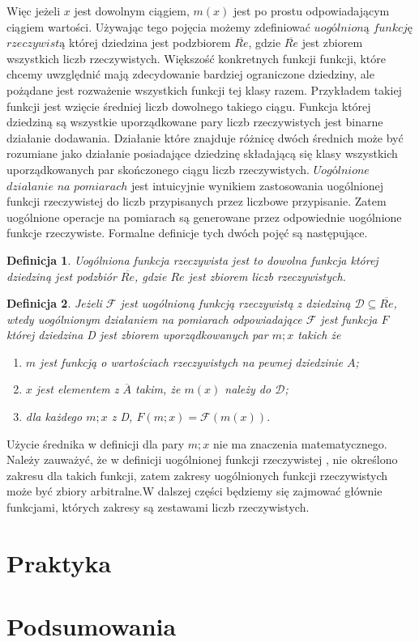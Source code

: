 \documentclass[12pt,a4paper]{report}
\newtheorem{definition}{Definicja}
\begin{document}
Więc jeżeli $x$ jest dowolnym ciągiem, $m(x)$ jest po prostu odpowiadającym ciągiem wartości. Używając tego pojęcia możemy zdefiniować $uogólnioną$ $funkcję$ $rzeczywistą$ której dziedzina jest podzbiorem $\overline{Re}$, gdzie $\overline{Re}$ jest zbiorem wszystkich liczb rzeczywistych. Większość konkretnych funkcji funkcji, które chcemy uwzględnić mają zdecydowanie bardziej ograniczone dziedziny, ale pożądane jest rozważenie wszystkich funkcji tej klasy razem. Przykładem takiej funkcji jest wzięcie średniej  liczb dowolnego takiego ciągu. Funkcja której dziedziną są wszystkie uporządkowane pary liczb rzeczywistych jest binarne działanie dodawania. Działanie które znajduje różnicę dwóch średnich może być rozumiane jako działanie posiadające dziedzinę składającą się klasy wszystkich uporządkowanych par skończonego ciągu liczb rzeczywistych. $Uogólnione$ $działanie$ $na$ $pomiarach$ jest intuicyjnie wynikiem zastosowania uogólnionej funkcji rzeczywistej  do liczb przypisanych przez liczbowe przypisanie. Zatem uogólnione operacje na pomiarach są generowane przez odpowiednie uogólnione funkcje rzeczywiste. Formalne definicje tych dwóch pojęć są następujące.
\begin{definition}
Uogólniona funkcja rzeczywista jest to dowolna funkcja której dziedziną jest podzbiór $\overline{Re}$, gdzie $Re$ jest zbiorem liczb rzeczywistych.
\end{definition}
\begin{definition}
Jeżeli $\mathcal{F}$ jest uogólnioną funkcją rzeczywistą z dziedziną $\mathcal{D}\subseteq\overline{Re}$, wtedy uogólnionym działaniem na pomiarach odpowiadające $\mathcal{F}$ jest funkcja $F$ której dziedzina D jest zbiorem uporządkowanych par $m;x$ takich że
\begin{enumerate}
\item
$m$ jest funkcją o wartościach rzeczywistych na pewnej dziedzinie $A$;
\item
$x$ jest elementem z $\overline{A}$ takim, że $m(x)$ należy do $\mathcal{D}$;
\item
dla każdego $m;x$ z D, $F(m;x)=\mathcal{F}(m(x))$.
\end{enumerate}

\end{definition}
Użycie średnika w definicji dla pary $m;x$ nie ma znaczenia matematycznego. Należy zauważyć, że w definicji uogólnionej funkcji rzeczywistej , nie określono zakresu dla takich funkcji, zatem zakresy uogólnionych funkcji rzeczywistych może być zbiory arbitralne.W dalszej części będziemy się zajmować głównie funkcjami, których zakresy są zestawami liczb rzeczywistych. 
\chapter{Praktyka}

\chapter{Podsumowania}



\end{document}
